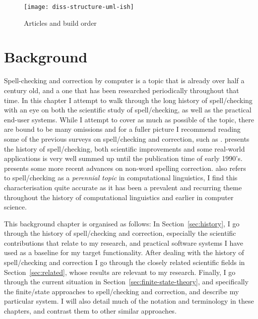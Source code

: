 \documentclass[officiallayout,final]{unihelcompling}
\begin{document}
\begin{figure}
    \texttt{[image: diss-structure-uml-ish]}
    \caption{Articles and build order
    \label{fig:schematic-diagram}}
\end{figure}

\chapter{Background}
\label{chap:background}

Spell-checking and correction by computer is a topic that is already over half
a century old, and a one that has been researched periodically throughout that
time.  In this chapter I attempt to walk through the long history of
spell\-/checking with an eye on both the scientific study of spell\-/checking,
as well as the practical end-user systems. While I attempt to cover as
much as possible of the topic, there are bound to be many omissions and for
a fuller picture I recommend reading some of the previous surveys on
spell\-/checking and correction, such as
\citet{kukich1992spelling,mitton2009ordering}.  \citet{kukich1992spelling}
presents
the history of spell\-/checking, both scientific improvements and some
real-world applications is very well summed up until the publication time of
early 1990's.  \citet{mitton2009ordering} presents some more recent advances on
non-word spelling correction.  \citet{kukich1992spelling} also refers to
spell\-/checking as a \emph{perennial topic} in computational linguistics, I
find this characterisation quite accurate as it has been a prevalent and
recurring theme throughout the history of computational linguistics and earlier
in computer science.


This background chapter is organised as follows: In
Section~\ref{sec:history}, I go through the history of spell\-/checking and
correction, especially the scientific contributions that relate to my research,
and practical software systems I have used as a baseline for my target
functionality.  After dealing with the history of spell\-/checking and
correction I go through the closely related scientific fields in
Section~\ref{sec:related}, whose results are relevant to my research. Finally,
I go through the current situation in Section~\ref{sec:finite-state-theory},
and specifically the finite\-/state approaches to spell\-/checking and
correction, and describe my particular system. I will also detail much of the
notation and terminology in these chapters, and contrast them to other similar
approaches.
\end{document}
